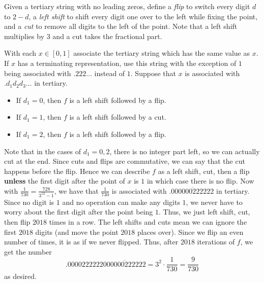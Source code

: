 Given a tertiary string with no leading zeros, define a \emph{flip} to switch every digit $d$ to $2-d$, a \emph{left shift} to shift every digit one over to the left while fixing the point, and a \emph{cut} to remove all digits to the left of the point. Note that a left shift multiplies by $3$ and a cut takes the fractional part.

With each $x\in\left[0,1\right]$ associate the tertiary string which has the same value as $x$. If $x$ has a terminating representation, use this string with the exception of $1$ being associated with $.222\ldots$ instead of $1$. Suppose that $x$ is associated with $.d_1d_2d_3\ldots$ in tertiary.
\begin{itemize}
	\item If $d_1=0$, then $f$ is a left shift followed by a flip.
	\item If $d_1=1$, then $f$ is a left shift followed by a cut.
	\item If $d_1=2$, then $f$ is a left shift followed by a flip.
\end{itemize}
Note that in the cases of $d_1=0,2$, there is no integer part left, so we can actually cut at the end. Since cuts and flips are commutative, we can say that the cut happens before the flip. Hence we can describe $f$ as a left shift, cut, then a flip \textbf{unless} the first digit after the point of $x$ is $1$ in which case there is no flip.
Now with $\frac{1}{730}=\frac{728}{3^{12}-1}$, we have that $\frac{1}{730}$ is associated with $.\overline{000000222222}$ in tertiary. Since no digit is $1$ and no operation can make any digits $1$, we never have to worry about the first digit after the point being $1$. Thus, we just left shift, cut, then flip $2018$ times in a row. The left shifts and cuts mean we can ignore the first $2018$ digits (and move the point $2018$ places over). Since we flip an even number of times, it is as if we never flipped. Thus, after $2018$ iterations of $f$, we get the number \[.0000222222\overline{000000222222}=3^2\cdot\frac{1}{730}=\boxed{\frac{9}{730}}\] as desired.